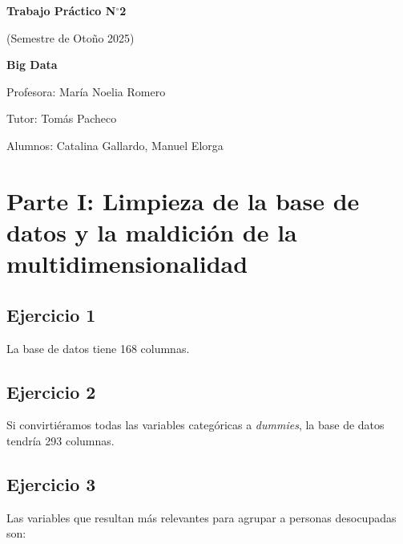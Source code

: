 \documentclass[11pt,a4paper]{article}
\begin{document}
\begin{titlepage}
\centering
\vspace*{3cm}

{\LARGE\bfseries Trabajo Práctico N$^{\circ}$2\par}
\vspace{0.4cm}
{\large (Semestre de Otoño 2025)\par}
\vspace{0.3cm}
{\large\bfseries Big Data\par}

\vfill

{\large Profesora: María Noelia Romero\par}
\vspace{0.2cm}
{\large Tutor: Tomás Pacheco\par}
\vspace{0.2cm}
{\large Alumnos: Catalina Gallardo, Manuel Elorga\par}

\vfill
\end{titlepage}

\section*{Parte I: Limpieza de la base de datos y la maldición de la multidimensionalidad}

\subsection*{Ejercicio 1}

La base de datos tiene 168 columnas.

\subsection*{Ejercicio 2}

Si convirtiéramos todas las variables categóricas a \textit{dummies}, la base de datos
tendría 293 columnas.

\subsection*{Ejercicio 3}

Las variables que resultan más relevantes para agrupar a personas desocupadas son:
\end{document}
